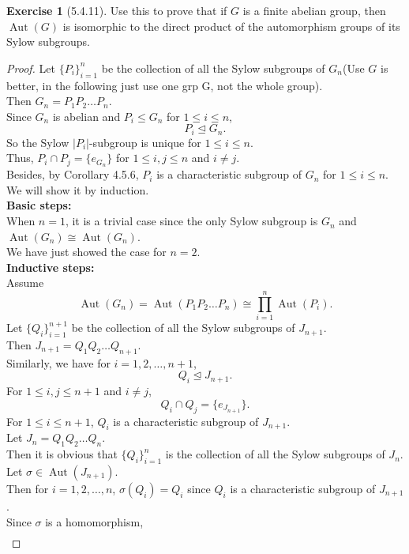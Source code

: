 \documentclass{amsart}
\theoremstyle{plain}
\theoremstyle{definition}
\newtheorem{exer}[lem]{Exercise}
\begin{document}
\begin{exer}[5.4.11]
Use this to prove that if $G$ is a finite abelian group, then $\operatorname{Aut}(G)$ is isomorphic to the direct product of the automorphism groups of its Sylow subgroups.
\begin{proof}
  Let $\{P_i\}_{i=1}^n$ be the collection of all the Sylow subgroups of $G_n$(Use $G$ is better, in the following just use one grp G, not the whole group).\\
	Then $G_n =  P_1P_2\ldots P_n$.\\
	Since $G_n$ is abelian and $P_i \leq G_n$ for $1\leq i \leq n$,\\
	\[P_i \unlhd G_n.\]
	So the Sylow $|P_i|$-subgroup is unique for $1\leq i \leq n$. \\
	Thus, $P_i \cap P_j = \{e_{G_n}\}$ for $1 \leq i,j \leq n$ and $i\neq j$.\\
	Besides, by Corollary 4.5.6, $P_i$ is a characteristic subgroup of $G_n$ for $1\leq i \leq n$.\\ 
	We will show it by induction.\\
	\textbf{Basic steps:}\\
	When $n=1$, it is a trivial case since the only Sylow subgroup is $G_n$ and $ \operatorname{Aut}(G_n) \cong \operatorname{Aut}(G_n)$.\\
	We have just showed the case for $n=2$.\\
	\textbf{Inductive steps:}\\
	Assume 
	\[\operatorname{Aut}(G_n)  = \operatorname{Aut}(P_1P_2\ldots P_n) \cong \prod_{i=1}^{n} \operatorname{Aut}(P_i).\]
    Let $\{Q_i\}_{i=1}^{n+1}$ be the collection of all the Sylow subgroups of $J_{n+1}$.\\
	Then $J_{n+1} =  Q_1Q_2\ldots Q_{n+1}$.\\
	Similarly, we have for $i=1,2,\ldots,n+1$,
	\[Q_i \unlhd J_{n+1}.\]
	For $1 \leq i,j \leq n+1$ and $i\neq j$,
	\[Q_i \cap Q_j = \{e_{J_{n+1}}\}.\]
	For $1\leq i \leq n+1$, $Q_i$ is a characteristic subgroup of $J_{n+1}$.\\
	Let $J_n = Q_1Q_2\ldots Q_n$.\\
	Then it is obvious that $\{Q_i\}_{i=1}^{n}$ is the collection of all the Sylow subgroups of $J_{n}$. \\
	Let $\sigma \in \operatorname{Aut}(J_{n+1})$.\\
	Then for $i = 1,2,\ldots,n$, $\sigma(Q_i)  = Q_i$ since $Q_i$ is a characteristic subgroup of $J_{n+1}$.\\ 
	Since $\sigma$ is a homomorphism,
	\begin{align*}

\end{align*}
\end{proof}
\end{exer}
\end{document}
